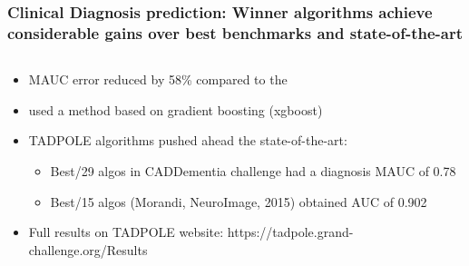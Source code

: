 \documentclass[8pt,xcolor=table,aspectratio=169]{beamer}
\begin{document}
\begin{frame}
\frametitle{\textbf{Clinical Diagnosis prediction:} Winner algorithms achieve considerable gains over best benchmarks and state-of-the-art}

\begin{columns}[t]
\begin{column}[t]{0.6\textwidth}
 \begin{itemize}
  \item MAUC error reduced by 58\% compared to the 
  
  \vspace{2em}
  
  \item {} used a method based on gradient boosting (xgboost)
  
  \vspace{2em}
  
  \item TADPOLE algorithms pushed ahead the state-of-the-art:
  \begin{itemize}
    \item Best/29 algos in CADDementia challenge had a diagnosis MAUC of 0.78
    \item Best/15 algos (Morandi, NeuroImage, 2015) obtained AUC of 0.902
   \end{itemize}

  \vspace{2em}
  
  \item Full results on TADPOLE website: https://tadpole.grand-challenge.org/Results
   

\end{itemize}
\end{column}
\end{columns}
\end{frame}
\end{document}
